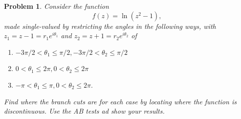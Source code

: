 \documentclass[12pt]{report}
\newtheorem{problem}{Problem}
\begin{document}
\newpage



\begin{problem}
    Consider the function
    \[ f(z) = \ln(z^2 -1),\]
    made single-valued by restricting the angles in the following ways, with $z_1 = z - 1 = r_1 e^{i\theta_1}$ and $z_2 = z +1 = r_2e^{i\theta_2}$ of
    \begin{enumerate}
        \item [(a)] $-3\pi/2 < \theta_1 \leq \pi / 2, - 3\pi /2 < \theta_2 \leq \pi / 2$
        \item [(b)] $0 < \theta_1 \leq 2 \pi, 0 < \theta_2 \leq 2 \pi$
        \item [(c)] $-\pi < \theta_1 \leq \pi, 0 < \theta_2 \leq 2 \pi.$
    \end{enumerate} 
    Find where the branch cuts are for each case by locating where the function is discontinuous. Use the AB tests ad show your results. 
\end{problem}
\end{document}
